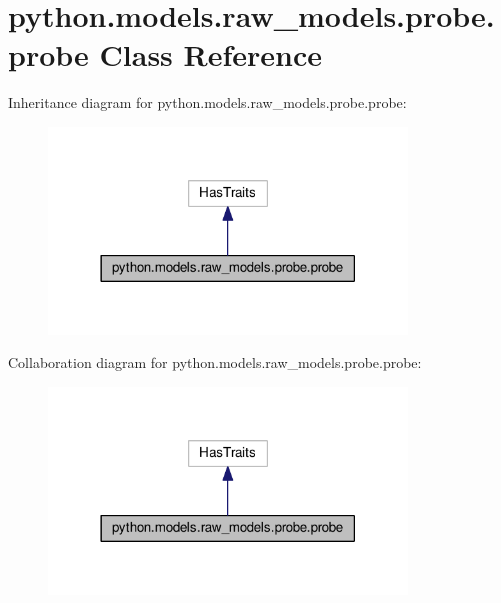 \hypertarget{classpython_1_1models_1_1raw__models_1_1probe_1_1probe}{\section{python.\-models.\-raw\-\_\-models.\-probe.\-probe Class Reference}
\label{classpython_1_1models_1_1raw__models_1_1probe_1_1probe}
}


Inheritance diagram for python.\-models.\-raw\-\_\-models.\-probe.\-probe\-:
\nopagebreak
\begin{figure}[H]
\begin{center}
\leavevmode
\includegraphics[width=270pt]{classpython_1_1models_1_1raw__models_1_1probe_1_1probe__inherit__graph}
\end{center}
\end{figure}


Collaboration diagram for python.\-models.\-raw\-\_\-models.\-probe.\-probe\-:
\nopagebreak
\begin{figure}[H]
\begin{center}
\leavevmode
\includegraphics[width=270pt]{classpython_1_1models_1_1raw__models_1_1probe_1_1probe__coll__graph}
\end{center}
\end{figure}
